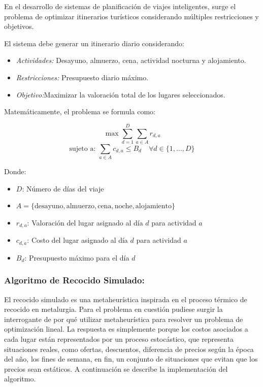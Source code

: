 \documentclass[10pt]{llncs}
\begin{document}

En el desarrollo de sistemas de planificación de viajes inteligentes, surge el problema de optimizar itinerarios turísticos considerando múltiples restricciones y objetivos.

El sistema debe generar un itinerario diario considerando:
\begin{itemize}
    \item \textit{Actividades:} Desayuno, almuerzo, cena, actividad nocturna y alojamiento.
    \item \textit{Restricciones:} Presupuesto diario máximo.
    \item \textit{Objetivo:}Maximizar la valoración total de los lugares seleccionados.
\end{itemize}

Matemáticamente, el problema se formula como:

\[
\max \sum_{d=1}^{D} \sum_{a \in A} r_{d,a}
\]
\[
\text{sujeto a: }
\sum_{a \in A} c_{d,a} \leq B_d \quad \forall d \in \{1,\dots,D\}
\]

Donde:
\begin{itemize}
    \item $D$: Número de días del viaje
    \item $A = \{\text{desayuno}, \text{almuerzo}, \text{cena}, \text{noche}, \text{alojamiento}\}$
    \item $r_{d,a}$: Valoración del lugar asignado al día $d$ para actividad $a$
    \item $c_{d,a}$: Costo del lugar asignado al día $d$ para actividad $a$
    \item $B_d$: Presupuesto máximo para el día $d$
\end{itemize}

\subsubsection{Algoritmo de Recocido Simulado:}
El recocido simulado es una metaheurística inspirada en el proceso térmico de recocido en metalurgia. Para el problema en cuestión pudiese surgir la 
interrogante de por qué utilizar metaheurística para resolver un problema de optimización lineal. La respuesta es simplemente porque los costos asociados a cada 
lugar están representados por un proceso estocástico, que representa situaciones reales, como ofertas, descuentos, diferencia de precios según la época del año, los 
fines de semana, en fin, un conjunto de situaciones que evitan que los precios sean estáticos. A continuación se describe la implementación del algoritmo.
\end{document}

